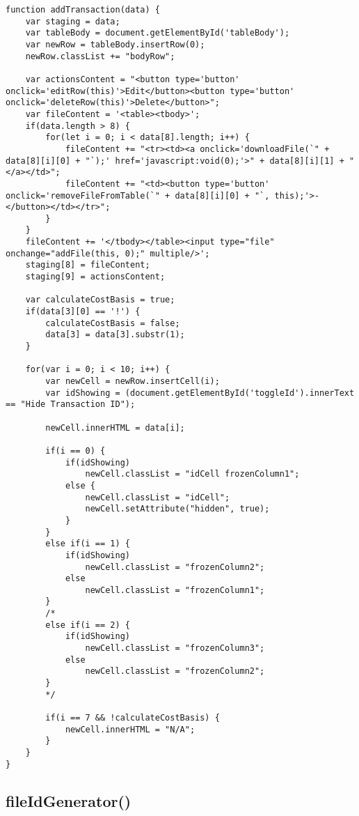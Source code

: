 \documentclass[letterpaper]{article}
\begin{document}
\begin{lstlisting}[firstnumber=165]
function addTransaction(data) {
    var staging = data;
    var tableBody = document.getElementById('tableBody');
    var newRow = tableBody.insertRow(0);
    newRow.classList += "bodyRow";

    var actionsContent = "<button type='button' onclick='editRow(this)'>Edit</button><button type='button' onclick='deleteRow(this)'>Delete</button>";
    var fileContent = '<table><tbody>';
    if(data.length > 8) {
        for(let i = 0; i < data[8].length; i++) {
            fileContent += "<tr><td><a onclick='downloadFile(`" + data[8][i][0] + "`);' href='javascript:void(0);'>" + data[8][i][1] + "</a></td>";
            fileContent += "<td><button type='button' onclick='removeFileFromTable(`" + data[8][i][0] + "`, this);'>-</button></td></tr>";
        }
    }
    fileContent += '</tbody></table><input type="file" onchange="addFile(this, 0);" multiple/>';
    staging[8] = fileContent;
    staging[9] = actionsContent;

    var calculateCostBasis = true;
    if(data[3][0] == '!') {
        calculateCostBasis = false;
        data[3] = data[3].substr(1);
    }

    for(var i = 0; i < 10; i++) {
        var newCell = newRow.insertCell(i);
        var idShowing = (document.getElementById('toggleId').innerText == "Hide Transaction ID");

        newCell.innerHTML = data[i];

        if(i == 0) {
            if(idShowing)
                newCell.classList = "idCell frozenColumn1";
            else {
                newCell.classList = "idCell";
                newCell.setAttribute("hidden", true);
            }
        }
        else if(i == 1) {
            if(idShowing)
                newCell.classList = "frozenColumn2";
            else
                newCell.classList = "frozenColumn1";
        }
        /*
        else if(i == 2) {
            if(idShowing)
                newCell.classList = "frozenColumn3";
            else
                newCell.classList = "frozenColumn2";
        }
        */

        if(i == 7 && !calculateCostBasis) {
            newCell.innerHTML = "N/A";
        }
    }
}
\end{lstlisting}

\subsection{fileIdGenerator()}
\end{document}
